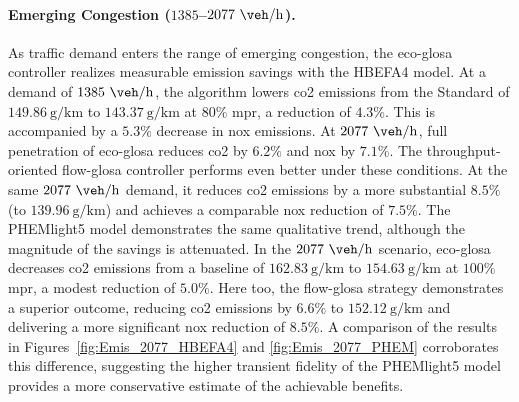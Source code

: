 \paragraph{Emerging Congestion ($1385$--$2077~\unit{\veh\per\hour}$).}
As traffic demand enters the range of emerging congestion, the \ac{eco-glosa} controller realizes measurable emission savings with the HBEFA4 model. At a demand of $1385~\unit{\veh\per\hour}$, the algorithm lowers \ac{co2} emissions from the Standard of $149.86~\unit{\gram\per\kilo\metre}$ to $143.37~\unit{\gram\per\kilo\metre}$ at $80\%$ \ac{mpr}, a reduction of $4.3\%$. This is accompanied by a $5.3\%$ decrease in \ac{nox} emissions. At $2077~\unit{\veh\per\hour}$, full penetration of \ac{eco-glosa} reduces \ac{co2} by $6.2\%$ and \ac{nox} by $7.1\%$. The throughput-oriented \ac{flow-glosa} controller performs even better under these conditions. At the same $2077~\unit{\veh\per\hour}$ demand, it reduces \ac{co2} emissions by a more substantial $8.5\%$ (to $139.96~\unit{\gram\per\kilo\metre}$) and achieves a comparable \ac{nox} reduction of $7.5\%$.
\mynewline
The PHEMlight5 model demonstrates the same qualitative trend, although the magnitude of the savings is attenuated. In the $2077~\unit{\veh\per\hour}$ scenario, \ac{eco-glosa} decreases \ac{co2} emissions from a baseline of $162.83~\unit{\gram\per\kilo\metre}$ to $154.63~\unit{\gram\per\kilo\metre}$ at $100\%$ \ac{mpr}, a modest reduction of $5.0\%$. Here too, the \ac{flow-glosa} strategy demonstrates a superior outcome, reducing \ac{co2} emissions by $6.6\%$ to $152.12~\unit{\gram\per\kilo\metre}$ and delivering a more significant \ac{nox} reduction of $8.5\%$. A comparison of the results in Figures~\vref{fig:Emis_2077_HBEFA4} and \vref{fig:Emis_2077_PHEM} corroborates this difference, suggesting the higher transient fidelity of the PHEMlight5 model provides a more conservative estimate of the achievable benefits.

